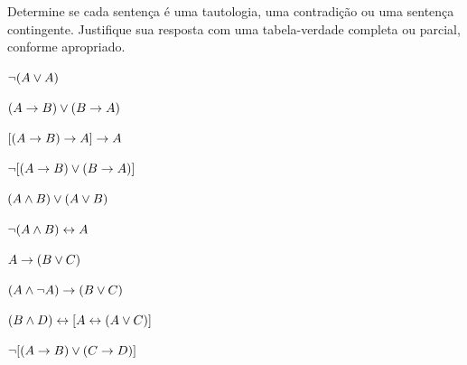 \noindent\problempart
\label{pr.TT.TTorC4}
Determine se cada sentença é uma tautologia, uma contradição ou uma sentença contingente. Justifique sua resposta com uma tabela-verdade completa ou parcial, conforme apropriado.
\begin{compactlist}
\item  $\neg (A \vee A)$\vspace{.5ex}		\hfill			{}	%
\item $(A \rightarrow B) \vee (B \rightarrow A)$\vspace{.5ex}	\hfill		{}	%
\item $[(A \rightarrow B) \rightarrow A] \rightarrow A$\vspace{.5ex}	\hfill			{}   %
\item $\neg[( A \rightarrow B) \vee (B \rightarrow A)]$\vspace{.5ex}	\hfill		{}	%
\item $(A \wedge B) \vee (A \vee B)$\vspace{.5ex} 	\hfill			{}	%
\item $\neg(A\wedge B) \leftrightarrow A$\vspace{.5ex} 		\hfill			{}	%
\item $A\rightarrow(B\vee C)$\vspace{.5ex} 				\hfill			{}	%
\item $(A \wedge\neg A) \rightarrow (B \vee C)$\vspace{.5ex} 	\hfill		{}	%
\item $(B\wedge D) \leftrightarrow [A \leftrightarrow(A \vee C)]$\vspace{.5ex}\hfill		{}	%
\item $\neg[(A \rightarrow B) \vee (C \rightarrow D)]$\vspace{.5ex} 	\hfill		{}	%
\end{compactlist}




